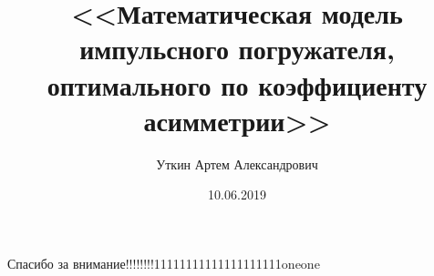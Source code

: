 \documentclass[10pt,pdf,hyperref={unicode}]{beamer}
\title{<<Математическая модель импульсного погружателя, оптимального по коэффициенту асимметрии>>}
\date{10.06.2019}
\author{Уткин Артем Александрович}
\begin{document}
    \begin{frame} %
        \titlepage
    \end{frame}

    \begin{frame}
        \centerline{\large Спасибо за внимание!!!!!!!!11111111111111111111oneone}
    \end{frame}
\end{document}
